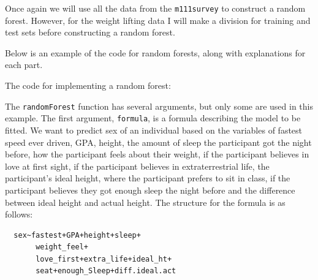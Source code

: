 \documentclass[12pt,twoside]{reedthesis}
\begin{document}
  Once again we will use all the data from the \texttt{m111survey} to
  construct a random forest. However, for the weight lifting data I will
  make a division for training and test sets before constructing a random
  forest.
  
  Below is an example of the code for random forests, along with
  explanations for each part.
  
  \newpage
  
  The code for implementing a random forest:
  
  \begin{Shaded}
  \begin{Highlighting}[]
  \NormalTok{(}\NormalTok{)}
  
  \StringTok{ }
  \StringTok{                             }
  \StringTok{                             }
  \StringTok{                             }
                               \NormalTok{)}
  \end{Highlighting}
  \end{Shaded}
  
  The \texttt{randomForest} function has several arguments, but only some
  are used in this example. The first argument, \texttt{formula}, is a
  formula describing the model to be fitted. We want to predict sex of an
  individual based on the variables of fastest speed ever driven, GPA,
  height, the amount of sleep the participant got the night before, how
  the participant feels about their weight, if the participant believes in
  love at first sight, if the participant believes in extraterrestrial
  life, the participant's ideal height, where the participant prefers to
  sit in class, if the participant believes they got enough sleep the
  night before and the difference between ideal height and actual height.
  The structure for the formula is as follows:
  
  \begin{verbatim}
  sex~fastest+GPA+height+sleep+
       weight_feel+
       love_first+extra_life+ideal_ht+
       seat+enough_Sleep+diff.ideal.act
       
  \end{verbatim}
  
\end{document}
